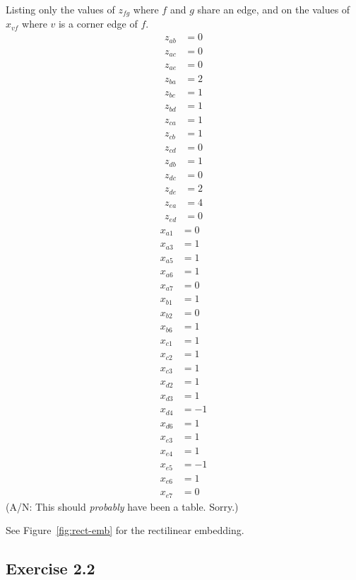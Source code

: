 Listing only the values of $z_{fg}$ where $f$ and $g$ share an edge,
and on the values of $x_{vf}$ where $v$ is a corner edge of $f$.
\begingroup
\newcommand\zfg[3]{z_{ #1 #2} &= #3}
\newcommand\xvf[3]{x_{ #1 #2} &= #3}
\begin{align*}
  \zfg a b 0 \\
  \zfg a c 0 \\
  \zfg a e 0 \\
  \zfg b a 2 \\
  \zfg b c 1 \\
  \zfg b d 1 \\
  \zfg c a 1 \\
  \zfg c b 1 \\
  \zfg c d 0 \\
  \zfg d b 1 \\
  \zfg d c 0 \\
  \zfg d e 2 \\
  \zfg e a 4 \\
  \zfg e d 0
\end{align*}
\begin{align*}
  \xvf a 1 0 \\
  \xvf a 3 1 \\
  \xvf a 5 1 \\
  \xvf a 6 1 \\
  \xvf a 7 0 \\
  \xvf b 1 1 \\
  \xvf b 2 0 \\
  \xvf b 6 1 \\
  \xvf c 1 1 \\
  \xvf c 2 1 \\
  \xvf c 3 1 \\
  \xvf d 2 1 \\
  \xvf d 3 1 \\
  \xvf d 4 {-1} \\
  \xvf d 6 1 \\
  \xvf e 3 1 \\
  \xvf e 4 1 \\
  \xvf e 5 {-1} \\
  \xvf e 6 1 \\
  \xvf e 7 0
\end{align*}
\endgroup
(A/N: This should \emph{probably} have been a table. Sorry.)

See Figure~\ref{fig:rect-emb} for the rectilinear embedding.

\subsection{Exercise 2.2}

